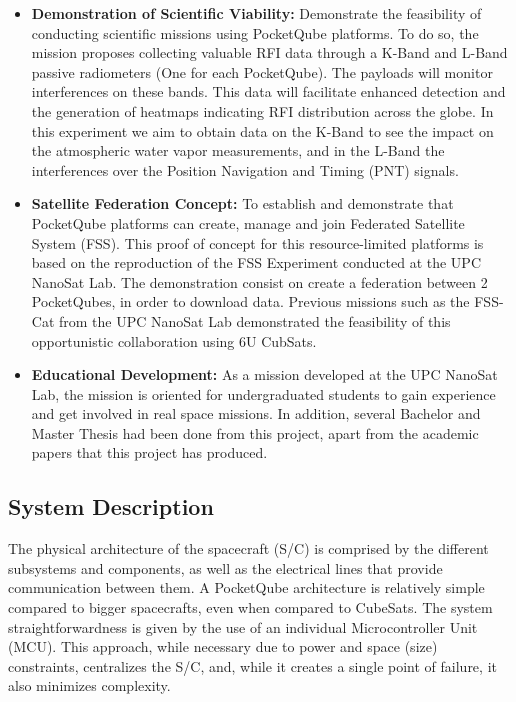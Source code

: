 \begin{itemize}
    \item \textbf{Demonstration of Scientific Viability:} Demonstrate the feasibility of 
    conducting scientific missions using PocketQube platforms. To do so, the mission
    proposes collecting valuable RFI data through a K-Band and L-Band passive 
    radiometers (One for each PocketQube). The payloads will monitor interferences on 
    these bands. This data will facilitate enhanced detection and the generation of
    heatmaps indicating RFI distribution across the globe. In this experiment we aim
    to obtain data on the K-Band to see the impact on the atmospheric water vapor 
    measurements, and in the L-Band the interferences over the Position Navigation 
    and Timing (PNT) signals.

    \item \textbf{Satellite Federation Concept:} To establish and demonstrate that 
    PocketQube platforms can create, manage and join Federated Satellite System 
    (FSS). This proof of concept for this resource-limited platforms is based on 
    the reproduction of the FSS Experiment conducted at the UPC NanoSat Lab. The 
    demonstration consist on create a federation between 2 PocketQubes, in order 
    to download data. Previous missions such as the FSS-Cat from the UPC NanoSat 
    Lab demonstrated the feasibility of this opportunistic collaboration using 6U 
    CubSats.

    \item \textbf{Educational Development:}  As a mission developed at the UPC NanoSat
     Lab, the mission is oriented for undergraduated students to gain experience and 
     get involved in real space missions. In addition, several Bachelor and Master 
     Thesis had been done from this project, apart from the academic papers that 
     this project has produced.

\end{itemize}

\subsection{System Description}

The physical architecture of the spacecraft (S/C) is comprised by the different 
subsystems and components, as well as the electrical lines that provide communication
between them. A PocketQube architecture is relatively simple compared to bigger 
spacecrafts, even when compared to CubeSats. The system straightforwardness is given 
by the use of an individual Microcontroller Unit (MCU). This approach, while 
necessary due to power and space (size) constraints, centralizes the S/C, and, 
while it creates a single point of failure, it also minimizes
complexity.
